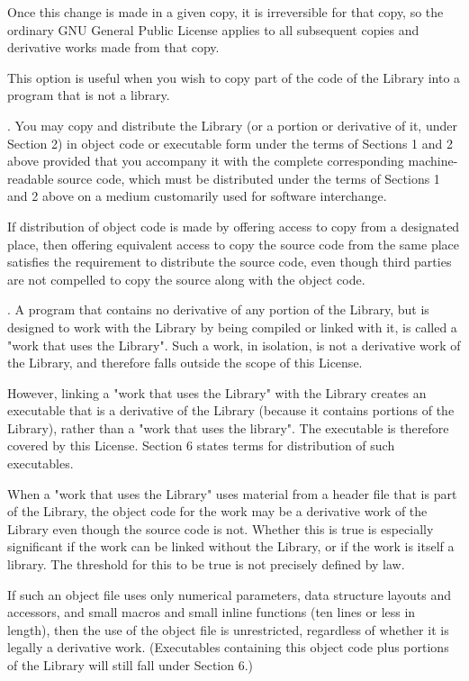Once this change is made in a given copy, it is irreversible for that copy, so the ordinary GNU General Public License applies to all subsequent copies and derivative works made from that copy. 

This option is useful when you wish to copy part of the code of the Library into a program that is not a library. 

. You may copy and distribute the Library (or a portion or derivative of it, under Section 2) in object code or executable form under the terms of Sections 1 and 2 above provided that you accompany it with the complete corresponding machine-readable source code, which must be distributed under the terms of Sections 1 and 2 above on a medium customarily used for software interchange. 

If distribution of object code is made by offering access to copy from a designated place, then offering equivalent access to copy the source code from the same place satisfies the requirement to distribute the source code, even though third parties are not compelled to copy the source along with the object code. 

. A program that contains no derivative of any portion of the Library, but is designed to work with the Library by being compiled or linked with it, is called a "work that uses the Library". Such a work, in isolation, is not a derivative work of the Library, and therefore falls outside the scope of this License. 

However, linking a "work that uses the Library" with the Library creates an executable that is a derivative of the Library (because it contains portions of the Library), rather than a "work that uses the library". The executable is therefore covered by this License. Section 6 states terms for distribution of such executables. 

When a "work that uses the Library" uses material from a header file that is part of the Library, the object code for the work may be a derivative work of the Library even though the source code is not. Whether this is true is especially significant if the work can be linked without the Library, or if the work is itself a library. The threshold for this to be true is not precisely defined by law. 

If such an object file uses only numerical parameters, data structure layouts and accessors, and small macros and small inline functions (ten lines or less in length), then the use of the object file is unrestricted, regardless of whether it is legally a derivative work. (Executables containing this object code plus portions of the Library will still fall under Section 6.) 

